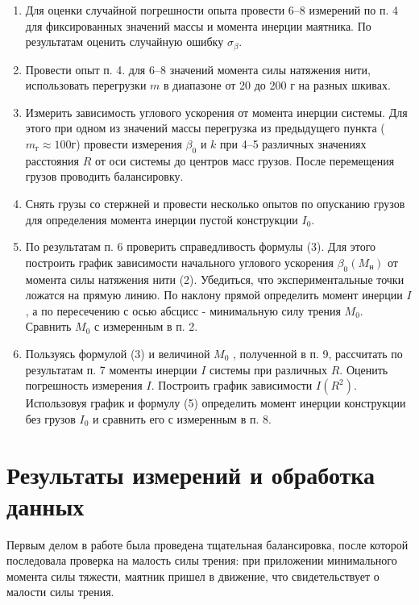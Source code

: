 \documentclass[a4paper]{article}
\begin{document}
\begin{enumerate}
Если на полученном графике существенны колебания зависимости $\beta(\omega)$ относительно прямой, уточните балансировку и повторите измерение. Если дальнейшее уточнение балансировки затруднено, оцените (грубо) погрешность, вносимую этими колебаниями в результат опыта.
\item Для оценки случайной погрешности опыта провести 6–8 измерений по п. 4 для фиксированных значений массы и момента инерции маятника. По результатам оценить случайную ошибку $\sigma_\beta$.
\item Провести опыт п. 4. для 6–8 значений момента силы натяжения нити, использовать перегрузки $m$ в диапазоне от 20 до 200 г на разных шкивах.
\item Измерить зависимость углового ускорения от момента инерции системы. Для этого при одном из значений массы перегрузка из предыдущего пункта ($m_г\approx 100 г$) провести измерения $\beta_0$ и $k$ при 4–5 различных значениях расстояния $R$ от оси системы до центров масс грузов. После перемещения грузов проводить балансировку.
\item Снять грузы со стержней и провести несколько опытов по опусканию грузов для определения момента инерции пустой конструкции $I_0$.
\item По результатам п. 6 проверить справедливость формулы (3). Для этого построить график зависимости начального углового ускорения $\beta_0(M_н)$ от момента силы натяжения нити (2). Убедиться, что  экспериментальные точки ложатся на прямую линию. По наклону прямой определить момент инерции $I$, а по пересечению с осью абсцисс - минимальную силу трения $M_0$. Сравнить $M_0$ с измеренным в п. 2.
\item Пользуясь формулой (3) и величиной $M_0$ , полученной в п. 9, рассчитать по результатам п. 7 моменты инерции $I$ системы при различных $R$. Оценить погрешность измерения $I$. Построить график зависимости $I(R^2)$. Использовуя график и формулу (5) определить момент инерции конструкции без грузов $I_0$ и сравнить его с измеренным в п. 8.
\end{enumerate}

\section{Результаты измерений и обработка данных}
Первым делом в работе была проведена тщательная балансировка, после которой последовала проверка на малость силы трения: при приложении минимального момента силы тяжести, маятник пришел в движение, что свидетельствует о малости силы трения.
\end{document}
